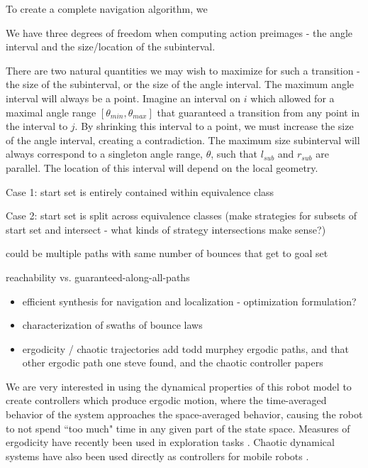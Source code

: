 \documentclass[]{styles/svproc}  %
\begin{document}
To create a complete navigation algorithm, we 

We have three degrees of freedom when computing action preimages - the angle
interval and the size/location of the subinterval.

There are two natural quantities we may wish to maximize for such a transition -
the size of the subinterval, or the size of the angle interval.
The maximum angle interval will always be a point. Imagine an interval on $i$
which allowed for a maximal angle range $[\theta_{min}, \theta_{max}]$ that
guaranteed a transition from any point in the interval to $j$. By
shrinking this interval to a point, we must increase the size of the angle
interval, creating a contradiction. The maximum size subinterval will always correspond to a singleton angle range,
$\theta$, such that $l_{sub}$ and $r_{sub}$ are parallel. The location of this
interval will depend on the local geometry.

Case 1: start set is entirely contained within equivalence class

Case 2: start set is split across equivalence classes (make strategies for
subsets of start set and intersect - what kinds of strategy intersections make
sense?)

could be multiple paths with same number of bounces that get to goal set

reachability vs. guaranteed-along-all-paths


{\color{red} 
\begin{itemize}
\item efficient synthesis for navigation and localization - optimization formulation?
\item characterization of swaths of bounce laws
\item ergodicity / chaotic trajectories
{\color{red} add todd murphey ergodic paths, and that other ergodic path one steve
found, and the chaotic controller papers}
\end{itemize}
}

We are very interested in using the dynamical properties of this robot model to
create controllers which produce ergodic motion, where the time-averaged
behavior of the system approaches the space-averaged behavior, causing the robot
to not spend ``too much" time in any given part of the state space. Measures
of ergodicity have recently been used in exploration tasks
\cite{miller2016ergodic}. Chaotic dynamical systems have also been used directly
as controllers for mobile robots \cite{nakamura2001chaotic}.
\end{document}
